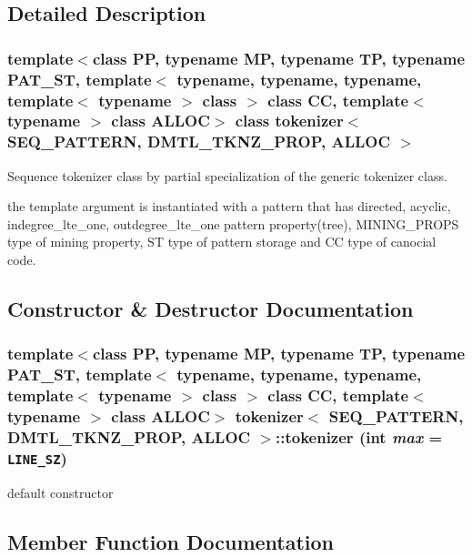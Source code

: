 \subsection{Detailed Description}
\subsubsection*{template$<$class PP, typename MP, typename TP, typename PAT\_\-ST, template$<$ typename, typename, typename, template$<$ typename $>$ class $>$ class CC, template$<$ typename $>$ class ALLOC$>$ class tokenizer$<$ SEQ\_\-PATTERN, DMTL\_\-TKNZ\_\-PROP, ALLOC $>$}

Sequence tokenizer class by partial specialization of the generic tokenizer class. 

the template argument is instantiated with a pattern that has directed, acyclic, indegree\_\-lte\_\-one, outdegree\_\-lte\_\-one pattern property(tree), MINING\_\-PROPS type of mining property, ST type of pattern storage and CC type of canocial code. 



\subsection{Constructor \& Destructor Documentation}
\subsubsection{\setlength{\rightskip}{0pt plus 5cm}template$<$class PP, typename MP, typename TP, typename PAT\_\-ST, template$<$ typename, typename, typename, template$<$ typename $>$ class $>$ class CC, template$<$ typename $>$ class ALLOC$>$ \bf{tokenizer}$<$ SEQ\_\-PATTERN, DMTL\_\-TKNZ\_\-PROP, ALLOC $>$::\bf{tokenizer} (int {\em max} = {\tt LINE\_\-SZ})\hspace{0.3cm}{\tt  [inline]}}\label{classtokenizer_3_01SEQ__PATTERN_00_01DMTL__TKNZ__PROP_00_01ALLOC_01_4_9254a52c6bfb0c7aa2954e11f8ad7a49}


default constructor 

\subsection{Member Function Documentation}

